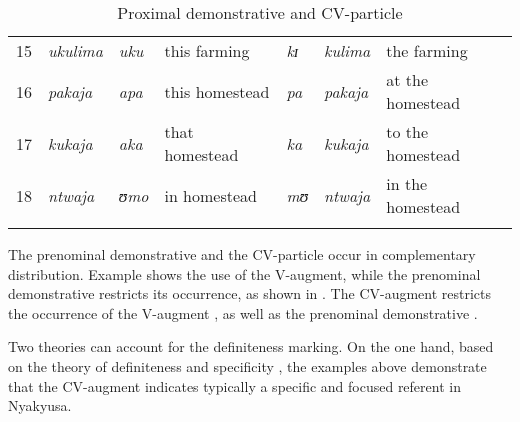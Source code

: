 \documentclass[output=paper]{langscibook}
\begin{document}
\begin{table}
\begin{tabular}{lllllll}
{15} & {\itshape ukulima} & {\textit{uku}} &  this farming & {\textit{kɪ}} & {\itshape kulima} & {the farming}\\
{16} & {\itshape pakaja} & {\itshape apa} & {this homestead} & {\itshape pa} & {\itshape pakaja} & {at the homestead}\\
{17} & {\itshape kukaja} & {\itshape aka} & {that homestead} & {\itshape ka} & {\itshape kukaja} & {to the homestead}\\
{18} & {\itshape ntwaja} & {\textit{ʊmo}} &  in homestead & {\textit{mʊ}} & {\itshape ntwaja} & {in the homestead}\\
\lspbottomrule
\end{tabular}
\caption{Proximal demonstrative and CV-particle}
\label{tab:lusekelo:1}
\end{table}

The prenominal demonstrative and the CV-particle occur in complementary distribution. Example  shows the use of the V-aug\-ment, while the prenominal demonstrative restricts its occurrence, as shown in . The CV-aug\-ment restricts the occurrence of the V-aug\-ment , as well as the prenominal demonstrative .   

\z

Two theories can account for the definiteness marking. On the one hand, based on the theory of definiteness and specificity \citep{Lyons1999}, the examples above demonstrate that the CV-aug\-ment indicates typically a specific and focused referent in Nyakyusa. 
\end{document}
